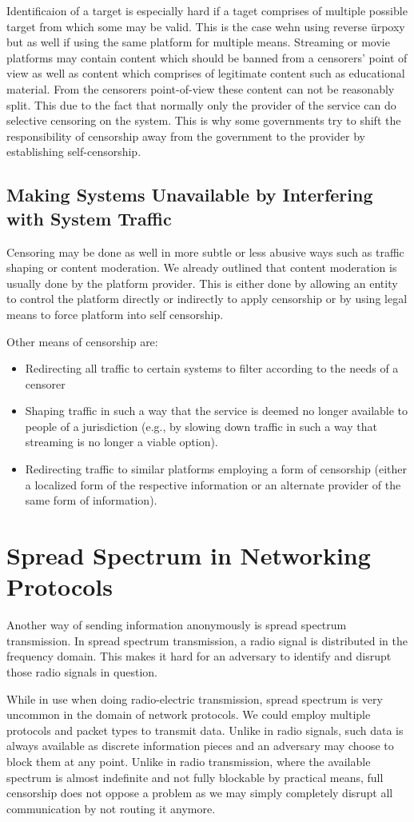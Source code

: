Identificaion of a target is especially hard if a taget comprises of multiple possible target from which some may be valid. This is the case wehn using reverse ürpoxy but as well if using the same platform for multiple means. Streaming or movie platforms may contain content which should be banned from a censorers' point of view as well as content which comprises of legitimate content such as educational material. From the censorers point-of-view these content can not be reasonably split. This due to the fact that normally only the provider of the service can do selective censoring on the system. This is why some governments try to shift the responsibility of censorship away from the government to the provider by establishing self-censorship. 

\subsection{Making Systems Unavailable by Interfering with System Traffic}
Censoring may be done as well in more subtle or less abusive ways such as traffic shaping or content moderation. We already outlined that content moderation is usually done by the platform provider. This is either done by allowing an entity to control the platform directly or indirectly to apply censorship or by using legal means to force platform into self censorship.

Other means of censorship are:
\begin{itemize}
	\item Redirecting all traffic to certain systems to filter according to the needs of a censorer
	\item Shaping traffic in such a way that the service is deemed no longer available to people of a jurisdiction (e.g., by slowing down traffic in such a way that streaming is no longer a viable option).
	\item Redirecting traffic to similar platforms employing a form of censorship (either a localized form of the respective information or an alternate provider of the same form of information).
\end{itemize}

\section{Spread Spectrum in Networking Protocols}
Another way of sending information anonymously is spread spectrum transmission. In spread spectrum transmission, a radio signal is distributed in the frequency domain. This makes it hard for an adversary to identify and disrupt those radio signals in question. 

While in use when doing radio-electric transmission, spread spectrum is very uncommon in the domain of network protocols. We could employ multiple protocols and packet types to transmit data. Unlike in radio signals, such data is always available as discrete information pieces and an adversary may choose to block them at any point. Unlike in radio transmission, where the available spectrum is almost indefinite and not fully blockable by practical means, full censorship does not oppose a problem as we may simply completely disrupt all communication by not routing it anymore.

